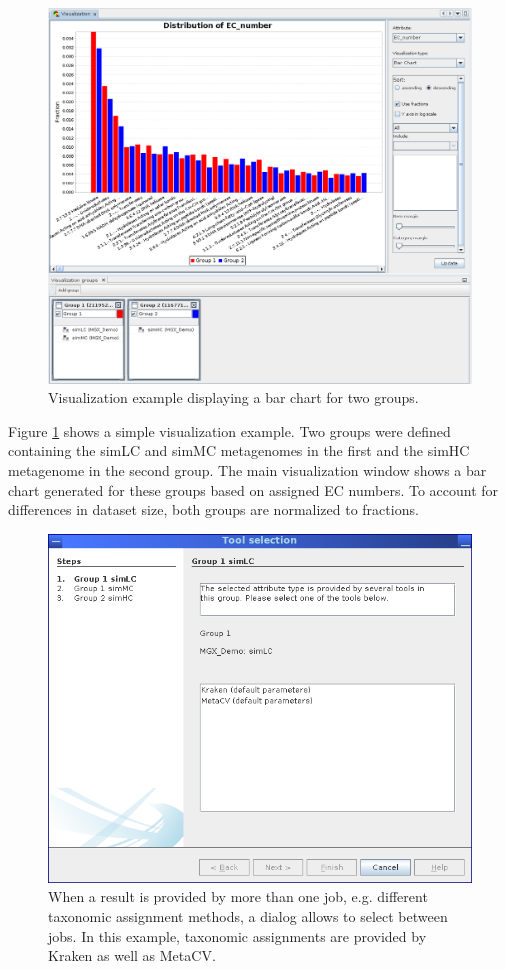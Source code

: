 \begin{figure}[H]
\centering
\includegraphics[width=\textwidth]{img/mgx/VizDemo}
\caption[Visualization example]{Visualization example displaying a bar chart for two groups.}
\label{viz3}
\end{figure}

Figure \ref{viz3} shows a simple visualization example. Two groups were defined containing the simLC and simMC metagenomes
in the first and the simHC metagenome in the second group. The main visualization window shows a bar chart
generated for these groups based on assigned EC numbers. To account for differences in dataset size, both
groups are normalized to fractions.

\begin{figure}[H]
\centering
\includegraphics[width=.8\textwidth]{img/mgx/ConflictResolver}
\caption[Job selection]{When a result is provided by more than one job, e.g. different taxonomic assignment methods,
a dialog allows to select between jobs. In this example, taxonomic assignments are provided by Kraken\cite{KRAKEN}
as well as MetaCV\cite{METACV}.}
\label{viz4}
\end{figure}

